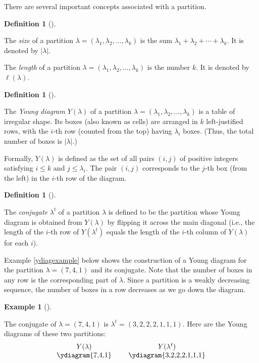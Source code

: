 \documentclass[numbers=enddot,12pt,final,onecolumn,notitlepage]{scrartcl}%
\theoremstyle{definition}
\newtheorem{defi}[theo]{Definition}
\newenvironment{definition}[1][]
{\begin{defi}[#1]\begin{leftbar}}
{\end{leftbar}\end{defi}}
\newtheorem{exam}[theo]{Example}
\newenvironment{example}[1][]
{\begin{exam}[#1]\begin{leftbar}}
{\end{leftbar}\end{exam}}
\newcommand{\abs}[1]{\left| #1 \right|}
\newcommand{\tup}[1]{\left( #1 \right)}
\renewcommand{\leq}{\leqslant}
\theoremstyle{plainsl}
\begin{document}

There are several important concepts associated with a partition.

\begin{definition}
The \emph{size} of a partition
$\lambda = \left(\lambda_1, \lambda_2, \ldots, \lambda_k\right)$
is the sum $\lambda_1 + \lambda_2 + \cdots + \lambda_k$.
It is denoted by $\abs{\lambda}$.

The \emph{length} of a partition
$\lambda = \left(\lambda_1, \lambda_2, \ldots, \lambda_k\right)$
is the number $k$.
It is denoted by $\ell\tup{\lambda}$.
\end{definition}

\begin{definition}
The \emph{Young diagram} $Y\tup{\lambda}$ of a partition
$\lambda = \left(\lambda_1, \lambda_2, \ldots, \lambda_k\right)$
is a table of irregular shape.
Its boxes (also known as cells) are arranged in
$k$ left-justified rows, with the $i$-th row (counted from the top)
having $\lambda_i$ boxes. (Thus, the total number of boxes
is $\abs{\lambda}$.)

Formally, $Y\tup{\lambda}$ is defined as the set of all pairs
$\tup{i, j}$ of positive integers satisfying $i \leq k$ and
$j \leq \lambda_i$. The pair $\tup{i, j}$ corresponds to the
$j$-th box (from the left) in the $i$-th row of the diagram.
\end{definition}

\begin{definition}
The \emph{conjugate} $\lambda^t$ of a partition $\lambda$ is defined to be the partition whose Young diagram is obtained from $Y\tup{\lambda}$ by flipping it across the main diagonal (i.e., the length of the $i$-th row of $Y\tup{\lambda^t}$ equals the length of the $i$-th column of $Y\tup{\lambda}$ for each $i$).
\end{definition}

Example \ref{ydiagexample} below shows the construction of a Young diagram for the partition $\lambda = (7,4,1)$ and its conjugate. Note that the number of boxes in any row is the corresponding part of $\lambda$. Since a partition is a weakly decreasing sequence, the number of boxes in a row decreases as we go down the diagram.

\Needspace{10pc}

\begin{example}
\label{ydiagexample}
The conjugate of $\lambda = (7,4,1)$ is $\lambda^t =(3,2,2,2,1,1,1)$.
Here are the Young diagrams of these two partitions:
\[
\begin{tabular}{ccc}
$Y(\lambda)$ & & $Y(\lambda^t)$ \\
\ydiagram{7,4,1}
&
&
\ydiagram{3,2,2,2,1,1,1}
\end{tabular}
\]
\end{example}
\end{document}
